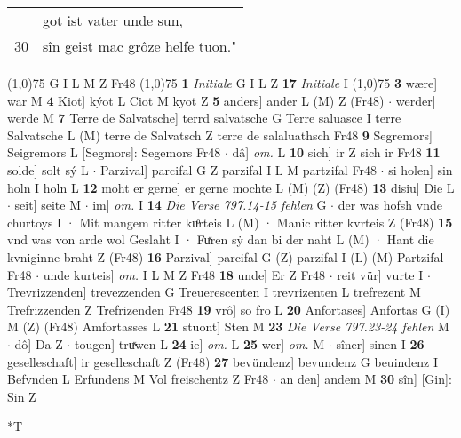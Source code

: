 \documentclass[8pt,a4paper,notitlepage]{article}
\begin{document}
\begin{table}[ht]
\begin{minipage}[t]{0.5\linewidth}
\begin{tabular}{rl}
 & got ist vater unde sun,\\ 
30 & sîn geist mac grôze helfe tuon."\\ 
\end{tabular}
\scriptsize
\line(1,0){75} \newline
G I L M Z Fr48 \newline
\line(1,0){75} \newline
\textbf{1} \textit{Initiale} G I L Z  \textbf{17} \textit{Initiale} I  \newline
\line(1,0){75} \newline
\textbf{3} wære] war M \textbf{4} Kiot] kýot L Ciot M kyot Z \textbf{5} anders] ander L (M) Z (Fr48)  $\cdot$ werder] werde M \textbf{7} Terre de Salvatsche] terrd salvatsche G Terre saluasce I terre Salvatsche L (M) terre de Salvatsch Z terre de salaluathsch Fr48 \textbf{9} Segremors] Seigremors L [Segmors]: Segemors Fr48  $\cdot$ dâ] \textit{om.} L \textbf{10} sich] ir Z sich ir Fr48 \textbf{11} solde] solt sý L  $\cdot$ Parzival] parcifal G Z parzifal I L M partzifal Fr48  $\cdot$ si holen] sin holn I holn L \textbf{12} moht er gerne] er gerne mochte L (M) (Z) (Fr48) \textbf{13} disiu] Die L  $\cdot$ seit] seite M  $\cdot$ im] \textit{om.} I \textbf{14} \textit{Die Verse 797.14-15 fehlen} G   $\cdot$ der was hofsh vnde churtoys I · Mit mangem ritter kuͦrteis L (M) · Manic ritter kvrteis Z (Fr48) \textbf{15} vnd was von arde wol Geslaht I · Fuͯren sẏ dan bi der naht L (M) · Hant die kvniginne braht Z (Fr48) \textbf{16} Parzival] parcifal G (Z) parzifal I (L) (M) Partzifal Fr48  $\cdot$ unde kurteis] \textit{om.} I L M Z Fr48 \textbf{18} unde] Er Z Fr48  $\cdot$ reit vür] vurte I  $\cdot$ Trevrizzenden] trevezzenden G Treuerescenten I trevrizenten L trefrezent M Trefrizzenden Z Trefrizenden Fr48 \textbf{19} vrô] so fro L \textbf{20} Anfortases] Anfortas G (I) M (Z) (Fr48) Amfortasses L \textbf{21} stuont] Sten M \textbf{23} \textit{Die Verse 797.23-24 fehlen} M   $\cdot$ dô] Da Z  $\cdot$ tougen] truͯwen L \textbf{24} ie] \textit{om.} L \textbf{25} wer] \textit{om.} M  $\cdot$ sîner] sinen I \textbf{26} geselleschaft] ir geselleschaft Z (Fr48) \textbf{27} bevündenz] bevundenz G beuindenz I Befvnden L Erfundens M Vol freischentz Z Fr48  $\cdot$ an den] andem M \textbf{30} sîn] [Gin]: Sin Z \newline
\end{minipage}
\hspace{0.5cm}
\begin{minipage}[t]{0.5\linewidth}
\small
\begin{center}*T

\end{center}
\end{minipage}
\end{table}
\end{document}
